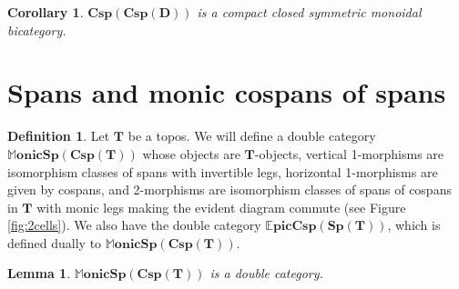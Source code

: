 \documentclass[11pt]{amsart}
\newcommand{\cat}[1]{\mathbf{#1}}
\newcommand{\bicspcsp}[1]{\mathbf{Csp(Csp(#1))}}
\newcommand{\dblmonspcsp}[1]{\mathbb{M}\mathbf{onicSp(Csp(#1))}}
\newcommand{\dblepiccspsp}[1]{\mathbb{E}\mathbf{picCsp(Sp(#1))}}
\newtheorem{lem}[thm]{Lemma}
\newtheorem{cor}[thm]{Corollary}
\theoremstyle{remark}
\theoremstyle{definition}
\newtheorem{defn}[thm]{Definition}
\begin{document}
\begin{cor}
	\label{cor:SpansSpansAreCCBicat}
	$\bicspcsp{D}$ is a compact closed symmetric monoidal bicategory.
\end{cor}

\section{Spans and monic cospans of spans} %
\label{sec:SpansCospans}

\begin{defn}
\label{def:DblCatMonSpanCsp}
	Let $\cat{T}$ be a topos. 
	We will define a double category 
		$\dblmonspcsp{T}$ 
	whose objects are $\cat{T}$-objects, 
	vertical 1-morphisms are isomorphism classes of spans with invertible legs, 
	horizontal 1-morphisms are given by cospans, and 
	2-morphisms are isomorphism classes of spans of cospans in $\cat{T}$ with monic legs 
	making the evident diagram commute (see Figure \ref{fig:2cells}). 
	We also have the double category $\dblepiccspsp{T}$, 
	which is defined dually to $\dblmonspcsp{T}$. 
\end{defn}

\begin{lem}
\label{lem:SpanCospanDoubleCat}
	$\dblmonspcsp{T}$ is a double category.  
\end{lem}
\end{document}
